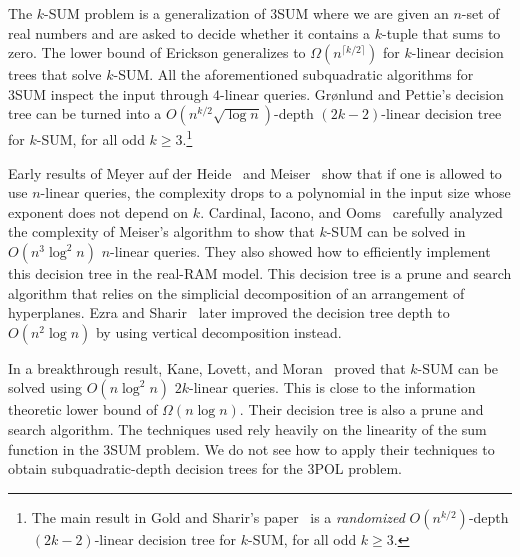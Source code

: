 The
$k$-SUM problem is a generalization of 3SUM where we are given an $n$-set of
real numbers and are asked to decide whether it contains a $k$-tuple that sums
to zero. The lower bound of Erickson generalizes to \( \Omega (n^{\lceil k/2
\rceil }) \) for \( k \)-linear decision trees that solve \( k \)-SUM\@.
All the aforementioned subquadratic algorithms for 3SUM inspect the input
through $4$-linear queries.  Gr\o nlund and Pettie's decision tree can be
turned into a \( O(n^{k/2} \sqrt{\log{n}}) \)-depth $(2k-2)$-linear decision
tree for $k$-SUM, for all odd $k \geq 3$.\footnote{The main result in Gold and Sharir's paper~\cite{GS15}
is a \emph{randomized} \(O(n^{k/2})\)-depth \((2k-2)\)-linear decision tree for
\(k\)-SUM, for all odd \(k \geq 3\).}

Early results of Meyer auf der Heide~\cite{M84} and Meiser~\cite{M93} show that if one is allowed to
use $n$-linear queries, the complexity drops to a polynomial in the input size
whose exponent does not depend on $k$. Cardinal, Iacono, and
Ooms~\cite{CIO16}
carefully analyzed the complexity of Meiser's algorithm to show that $k$-SUM
can be solved in \( O(n^3 \log^2 n) \) $n$-linear queries. They also showed how
to efficiently implement this decision tree in the real-RAM model. This decision
tree is a prune and search algorithm that relies on the simplicial
decomposition of an arrangement of hyperplanes. Ezra and
Sharir~\cite{ES17}
later improved the decision tree depth to \( O(n^2 \log n) \) by using
vertical decomposition instead.
%

In a breakthrough result, Kane, Lovett, and Moran~\cite{KLM17} proved
that $k$-SUM can be solved using $O(n \log^2 n)$ $2k$-linear queries. This is
close to the information theoretic lower bound of $\Omega(n \log n)$. Their
decision tree is also a prune and search algorithm. The techniques used rely
heavily on the linearity of the sum function in the 3SUM problem. We do not see
how to apply their techniques to obtain subquadratic-depth decision trees for
the 3POL problem.
